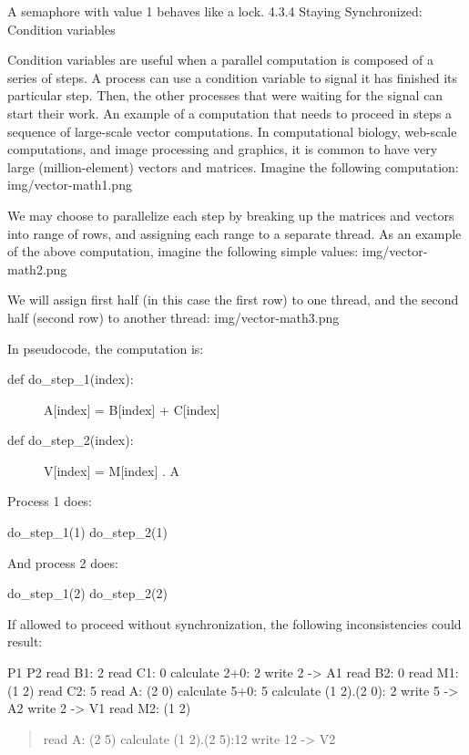 \documentclass[letterpaper,10pt,dvipdfmx]{sphinxmanual}
\begin{document}
A semaphore with value 1 behaves like a lock.
4.3.4   Staying Synchronized: Condition variables

Condition variables are useful when a parallel computation is composed of a series of steps. A process can use a condition variable to signal it has finished its particular step. Then, the other processes that were waiting for the signal can start their work. An example of a computation that needs to proceed in steps a sequence of large-scale vector computations. In computational biology, web-scale computations, and image processing and graphics, it is common to have very large (million-element) vectors and matrices. Imagine the following computation:
img/vector-math1.png

We may choose to parallelize each step by breaking up the matrices and vectors into range of rows, and assigning each range to a separate thread. As an example of the above computation, imagine the following simple values:
img/vector-math2.png

We will assign first half (in this case the first row) to one thread, and the second half (second row) to another thread:
img/vector-math3.png

In pseudocode, the computation is:
\begin{description}
\item[{def do\_step\_1(index):}] \leavevmode
A{[}index{]} = B{[}index{]} + C{[}index{]}

\item[{def do\_step\_2(index):}] \leavevmode
V{[}index{]} = M{[}index{]} . A

\end{description}

Process 1 does:

do\_step\_1(1)
do\_step\_2(1)

And process 2 does:

do\_step\_1(2)
do\_step\_2(2)

If allowed to proceed without synchronization, the following inconsistencies could result:

P1                          P2
read B1: 2
read C1: 0
calculate 2+0: 2
write 2 -\textgreater{} A1               read B2: 0
read M1: (1 2)              read C2: 5
read A: (2 0)               calculate 5+0: 5
calculate (1 2).(2 0): 2    write 5 -\textgreater{} A2
write 2 -\textgreater{} V1               read M2: (1 2)
\begin{quote}

read A: (2 5)
calculate (1 2).(2 5):12
write 12 -\textgreater{} V2
\end{quote}
\end{document}
